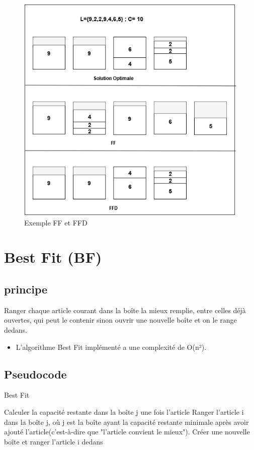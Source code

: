 \documentclass[class=article, crop=false]{standalone}
\begin{document}
\begin{figure}[H]
    \includegraphics[width=\linewidth]{../figures/FF FFD.png}
    \caption{Exemple FF et FFD}
\end{figure}

\section{Best Fit (BF)}
\subsection{principe}
Ranger chaque article courant dans la boîte la mieux remplie, entre celles déjà ouvertes, qui peut le contenir sinon ouvrir une nouvelle boîte et on le range dedans.
\begin{itemize}
    \item L’algorithme Best Fit implémenté a une complexité de O(n²).
\end{itemize}

\subsection{Pseudocode}
\begin{algorithm}[!h]
    \caption{Best Fit}
    \begin{algorithmic}
              \STATE Calculer la capacité restante dans la boîte j une fois l'article
             \ENDIF 
        \ENDFOR
        \STATE Ranger l’article i dans la boîte j, où j est la boîte ayant la capacité restante minimale après avoir ajouté l’article(c'est-à-dire que "l’article convient le mieux").
            \STATE Créer une nouvelle boîte et ranger l’article i dedans
        \ENDIF
    \ENDFOR
    \end{algorithmic}
\end{algorithm}
\end{document}
